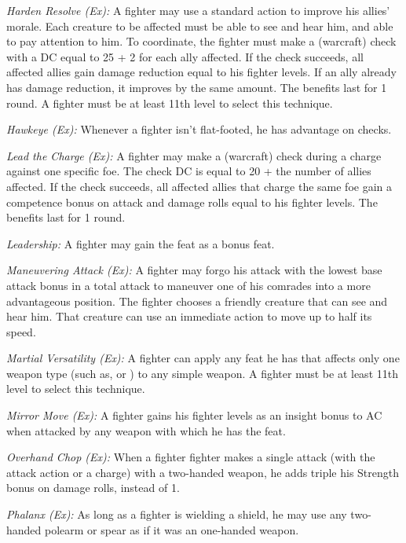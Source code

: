 \textit{Harden Resolve (Ex):} A fighter may use a standard action to improve his allies' morale. Each creature to be affected must be able to see and hear him, and able to pay attention to him. To coordinate, the fighter must make a  (warcraft) check with a DC equal to 25 + 2 for each ally affected. If the check succeeds, all affected allies gain damage reduction equal to \onequarter his fighter levels. If an ally already has damage reduction, it improves by the same amount. The benefits last for 1 round. A fighter must be at least 11th level to select this technique.

\textit{Hawkeye (Ex):} Whenever a fighter isn't flat-footed, he has advantage on  checks.

\textit{Lead the Charge (Ex):} A fighter may make a  (warcraft) check during a charge against one specific foe. The check DC is equal to 20 + the number of allies affected. If the check succeeds, all affected allies that charge the same foe gain a competence bonus on attack and damage rolls equal to \onequarter his fighter levels. The benefits last for 1 round.

\textit{Leadership:} A fighter may gain the  feat as a bonus feat.

\textit{Maneuvering Attack (Ex):} A fighter may forgo his attack with the lowest base attack bonus in a total attack to maneuver one of his comrades into a more advantageous position. The fighter chooses a friendly creature that can see and hear him. That creature can use an immediate action to move up to half its speed.

\textit{Martial Versatility (Ex):} A fighter can apply any feat he has that affects only one weapon type (such as,  or ) to any simple weapon. A fighter must be at least 11th level to select this technique.

\textit{Mirror Move (Ex):} A fighter gains \onequarter his fighter levels as an insight bonus to AC when attacked by any weapon with which he has the  feat.

\textit{Overhand Chop (Ex):} When a fighter fighter makes a single attack (with the attack action or a charge) with a two-handed weapon, he adds triple his Strength bonus on damage rolls, instead of 1\onehalf.

\textit{Phalanx (Ex):} As long as a fighter is wielding a shield, he may use any two-handed polearm or spear as if it was an one-handed weapon.

